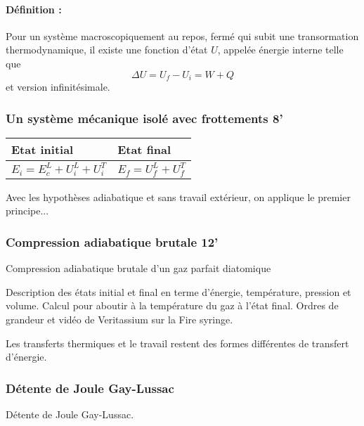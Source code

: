 \paragraph{Définition :}
Pour un système macroscopiquement au repos, fermé qui subit une transormation thermodynamique, il existe une fonction d'état $U$, appelée énergie interne telle que
\begin{equation}
\Delta U = U_f-U_i = W+Q
\end{equation}
et version infinitésimale.

\subsubsection{Un système mécanique isolé avec frottements 8'}

\begin{table}[!h]
\center
\begin{tabular}{l|l}
Etat initial & Etat final \\
\hline
$E_i = E_c^L + U_i^L + U_i^T$ & $E_f = U_f^L + U_f^T$
\end{tabular}
\end{table}

Avec les hypothèses adiabatique et sans travail extérieur, on applique le premier principe...

\subsubsection{Compression adiabatique brutale 12'}

\begin{slide}
Compression adiabatique brutale d'un gaz parfait diatomique
\end{slide}

Description des états initial et final en terme d'énergie, température, pression et volume.
Calcul pour aboutir à la température du gaz à l'état final.
Ordres de grandeur et vidéo de Veritassium sur la Fire syringe.

Les transferts thermiques et le travail restent des formes différentes de transfert d'énergie.

\subsubsection{Détente de Joule Gay-Lussac}

\begin{slide}
Détente de Joule Gay-Lussac.
\end{slide}

